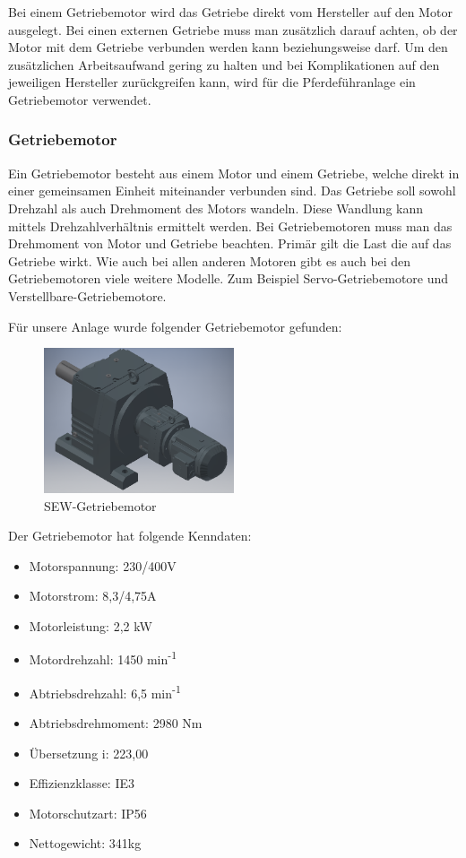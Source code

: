 Bei einem Getriebemotor wird das Getriebe direkt vom Hersteller auf den Motor ausgelegt. Bei einen externen Getriebe muss man zusätzlich darauf achten, ob der Motor mit dem Getriebe verbunden werden kann beziehungsweise darf. Um den zusätzlichen Arbeitsaufwand gering zu halten und bei Komplikationen auf den jeweiligen Hersteller zurückgreifen kann, wird für die Pferdeführanlage ein Getriebemotor verwendet.

\subsubsection{Getriebemotor}
\label{sec:getriebemotor}

Ein Getriebemotor  besteht aus einem Motor und einem Getriebe, welche direkt in einer gemeinsamen Einheit miteinander verbunden sind. Das Getriebe soll sowohl Drehzahl als auch Drehmoment des Motors wandeln. Diese Wandlung kann mittels Drehzahlverhältnis ermittelt werden. Bei Getriebemotoren muss man das Drehmoment von Motor und Getriebe beachten. Primär gilt die Last die auf das Getriebe wirkt. 
Wie auch bei allen anderen Motoren gibt es auch bei den Getriebemotoren viele weitere Modelle. Zum Beispiel Servo-Getriebemotore und Verstellbare-Getriebemotore.

Für unsere Anlage wurde folgender Getriebemotor gefunden:

\begin{figure}[H]
\begin{center}
	\includegraphics[width=0.5\textwidth]{fig/SEWGetriebemotor}
	\caption{SEW-Getriebemotor}
\end{center}
\end{figure}

Der Getriebemotor hat folgende Kenndaten:

\begin{itemize}
	\item{Motorspannung: 230/400V}
	\item{Motorstrom: 8,3/4,75A}
	\item{Motorleistung: 2,2 kW}
	\item{Motordrehzahl: 1450 min\textsuperscript{-1}}
	\item{Abtriebsdrehzahl: 6,5 min\textsuperscript{-1}}
	\item{Abtriebsdrehmoment: 2980 Nm}
	\item{Übersetzung i: 223,00}
	\item{Effizienzklasse: IE3}
	\item{Motorschutzart: IP56}
	\item{Nettogewicht: 341kg}
\end{itemize}

